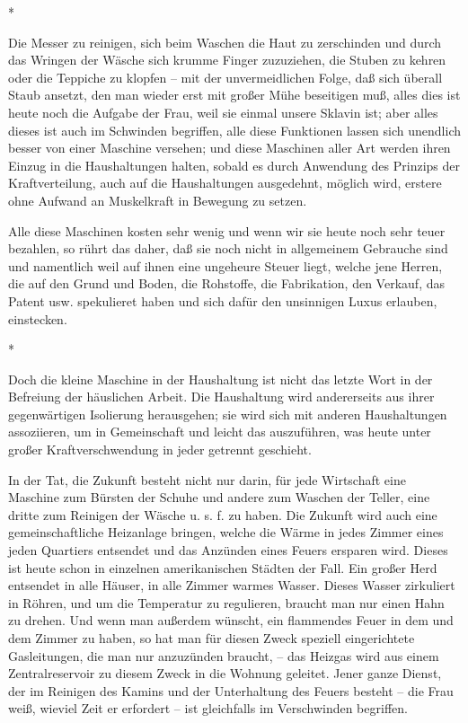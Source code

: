 \documentclass{scrbook}
\begin{document}
\begin{center}*\end{center}

Die Messer zu reinigen, sich beim Waschen die Haut zu zerschinden und durch das Wringen der Wäsche sich krumme Finger zuzuziehen, die Stuben zu kehren oder die Teppiche zu klopfen – mit der unvermeidlichen Folge, daß sich überall Staub ansetzt, den man wieder erst mit großer Mühe beseitigen muß, alles dies ist heute noch die Aufgabe der Frau, weil sie einmal unsere Sklavin ist; aber alles dieses ist auch im Schwinden begriffen, alle diese Funktionen lassen sich unendlich besser von einer Maschine versehen; und diese Maschinen aller Art werden ihren Einzug in die Haushaltungen halten, sobald es durch Anwendung des Prinzips der Kraftverteilung, auch auf die Haushaltungen ausgedehnt, möglich wird, erstere ohne Aufwand an Muskelkraft in Bewegung zu setzen.

Alle diese Maschinen kosten sehr wenig und wenn wir sie heute noch sehr teuer bezahlen, so rührt das daher, daß sie noch nicht in allgemeinem Gebrauche sind und namentlich weil auf ihnen eine ungeheure Steuer liegt, welche jene Herren, die auf den Grund und Boden, die Rohstoffe, die Fabrikation, den Verkauf, das Patent usw. spekulieret haben und sich dafür den unsinnigen Luxus erlauben, einstecken.

\begin{center}*\end{center}

Doch die kleine Maschine in der Haushaltung ist nicht das letzte Wort in der Befreiung der häuslichen Arbeit. Die Haushaltung wird andererseits aus ihrer gegenwärtigen Isolierung herausgehen; sie wird sich mit anderen Haushaltungen assoziieren, um in Gemeinschaft und leicht das auszuführen, was heute unter großer Kraftverschwendung in jeder getrennt geschieht.

In der Tat, die Zukunft besteht nicht nur darin, für jede Wirtschaft eine Maschine zum Bürsten der Schuhe und andere zum Waschen der Teller, eine dritte zum Reinigen der Wäsche u. s. f. zu haben. Die Zukunft wird auch eine gemeinschaftliche Heizanlage bringen, welche die Wärme in jedes Zimmer eines jeden Quartiers entsendet und das Anzünden eines Feuers ersparen wird. Dieses ist heute schon in einzelnen amerikanischen Städten der Fall. Ein großer Herd entsendet in alle Häuser, in alle Zimmer warmes Wasser. Dieses Wasser zirkuliert in Röhren, und um die Temperatur zu regulieren, braucht man nur einen Hahn zu drehen. Und wenn man außerdem wünscht, ein flammendes Feuer in dem und dem Zimmer zu haben, so hat man für diesen Zweck speziell eingerichtete Gasleitungen, die man nur anzuzünden braucht, – das Heizgas wird aus einem Zentralreservoir zu diesem Zweck in die Wohnung geleitet. Jener ganze Dienst, der im Reinigen des Kamins und der Unterhaltung des Feuers besteht – die Frau weiß, wieviel Zeit er erfordert – ist gleichfalls im Verschwinden begriffen.
\end{document}
